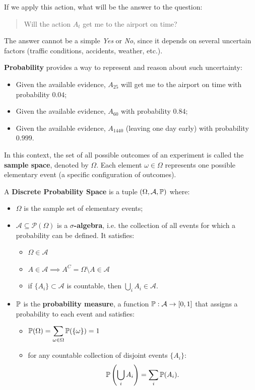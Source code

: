 \documentclass[10pt, letterpaper]{report}
\begin{document}
If we apply this action, what will be the answer to the question:
\begin{quote}
	Will the action $A_t$ get me to the airport on time?
\end{quote}

The answer cannot be a simple \textit{Yes} or \textit{No}, since it depends on several uncertain factors (traffic conditions, accidents, weather, etc.).

\smallskip
\textbf{Probability} provides a way to represent and reason about such uncertainty:
\begin{itemize}
	\item Given the available evidence, $A_{25}$ will get me to the airport on time with probability $0.04$;
	\item Given the available evidence, $A_{60}$ with probability $0.84$;
	\item Given the available evidence, $A_{1440}$ (leaving one day early) with probability $0.999$.
\end{itemize}

In this context, the set of all possible outcomes of an experiment is called the \textbf{sample space}, denoted by $\Omega$.
Each element $\omega \in \Omega$ represents one possible elementary event (a specific configuration of outcomes).

\begin{definition}
	A \textbf{Discrete Probability Space} is a tuple $(\Omega, \mathcal A, {\mathbb P})$ where:
	\begin{itemize}
		\item $\Omega$ is the sample set of elementary events;
		\item $\mathcal A \subseteq \mathcal P(\Omega)$ is a \textbf{$\sigma$-algebra}, i.e. the collection of all events for which a probability can be defined.
		      It satisfies:
		      \begin{itemize}
			      \item $\Omega \in \mathcal A$
			      \item $A \in \mathcal A \implies A^C = \Omega \setminus A \in \mathcal A$
			      \item if $\{A_i\} \subset \mathcal A$ is countable, then $\bigcup_i A_i \in \mathcal A$.
		      \end{itemize}
		\item ${\mathbb P}$ is the \textbf{probability measure}, a function ${\mathbb P}: \mathcal A \rightarrow [0,1]$ that assigns a probability to each event and satisfies:
		      \begin{itemize}
			      \item ${\mathbb P}(\Omega) = \displaystyle\sum_{\omega \in \Omega} {\mathbb P}(\{\omega\}) = 1$
			      \item for any countable collection of disjoint events $\{A_i\}$:
			            \begin{equation}
				            {\mathbb P}\left(\bigcup_i A_i\right) = \sum_i {\mathbb P}(A_i).
			            \end{equation}
		      \end{itemize}
	\end{itemize}
\end{definition}
\end{document}
